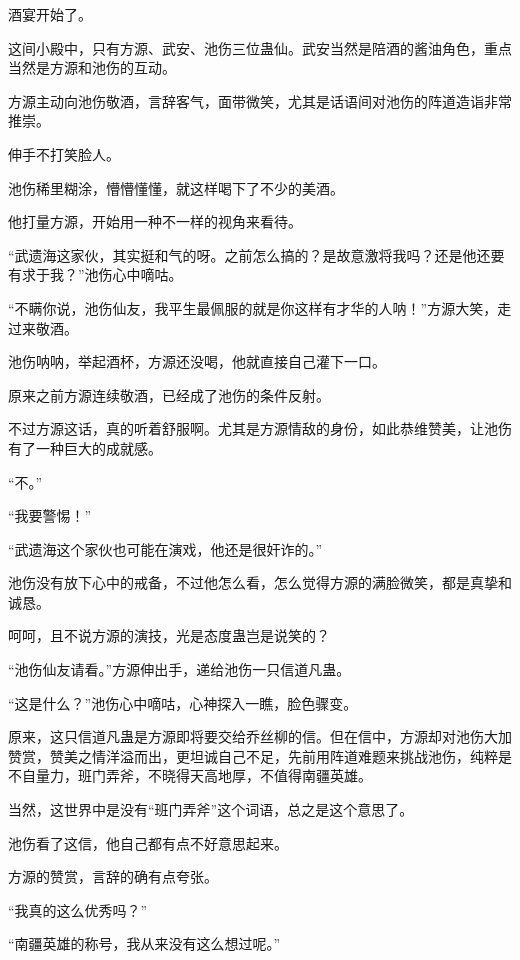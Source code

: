 
\begin{this_body}



酒宴开始了。

这间小殿中，只有方源、武安、池伤三位蛊仙。武安当然是陪酒的酱油角色，重点当然是方源和池伤的互动。

方源主动向池伤敬酒，言辞客气，面带微笑，尤其是话语间对池伤的阵道造诣非常推崇。

伸手不打笑脸人。

池伤稀里糊涂，懵懵懂懂，就这样喝下了不少的美酒。

他打量方源，开始用一种不一样的视角来看待。

“武遗海这家伙，其实挺和气的呀。之前怎么搞的？是故意激将我吗？还是他还要有求于我？”池伤心中嘀咕。

“不瞒你说，池伤仙友，我平生最佩服的就是你这样有才华的人呐！”方源大笑，走过来敬酒。

池伤呐呐，举起酒杯，方源还没喝，他就直接自己灌下一口。

原来之前方源连续敬酒，已经成了池伤的条件反射。

不过方源这话，真的听着舒服啊。尤其是方源情敌的身份，如此恭维赞美，让池伤有了一种巨大的成就感。

“不。”

“我要警惕！”

“武遗海这个家伙也可能在演戏，他还是很奸诈的。”

池伤没有放下心中的戒备，不过他怎么看，怎么觉得方源的满脸微笑，都是真挚和诚恳。

呵呵，且不说方源的演技，光是态度蛊岂是说笑的？

“池伤仙友请看。”方源伸出手，递给池伤一只信道凡蛊。

“这是什么？”池伤心中嘀咕，心神探入一瞧，脸色骤变。

原来，这只信道凡蛊是方源即将要交给乔丝柳的信。但在信中，方源却对池伤大加赞赏，赞美之情洋溢而出，更坦诚自己不足，先前用阵道难题来挑战池伤，纯粹是不自量力，班门弄斧，不晓得天高地厚，不值得南疆英雄。

当然，这世界中是没有“班门弄斧”这个词语，总之是这个意思了。

池伤看了这信，他自己都有点不好意思起来。

方源的赞赏，言辞的确有点夸张。

“我真的这么优秀吗？”

“南疆英雄的称号，我从来没有这么想过呢。”


\end{this_body}
